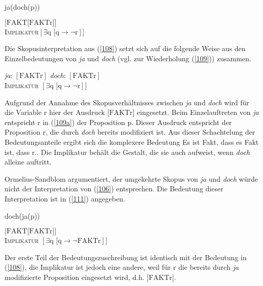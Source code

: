 \begin{exe}
	\ex\label{107}														 
	ja(doch(p))
\end{exe}

\begin{exe}
	\ex\label{108}														 
	$[\textrm{FAKT[FAKTr]]}$\\
	\textsc{Implikatur}$ [\exists \textrm{q [q} \rightarrow \neg \textrm{r}]]$
	\hfill\hbox {\citet[93]{Ormelius-Sandblom1997}}
\end{exe}
Die Skopusinterpretation aus (\ref{108}) setzt sich auf die folgende Weise aus den Einzelbedeutungen von \textit{ja} und \textit{doch} (vgl. zur Wiederholung (\ref{109})) zusammen.

\begin{exe}
	\ex\label{109} 
		\begin{xlist}	
			\ex\label{109a} \textit{ja}: $[\textrm{FAKTr}]$
			\ex\label{109b}  \textit{doch}: $[\textrm{FAKTr}]$ \\
							\textsc{Implikatur} $[\exists \textrm{q [q} \rightarrow \neg \textrm{r}]]$			
		\end{xlist}
\end{exe}
Aufgrund der Annahme des Skopusverhältnisses zwischen \textit{ja }und \textit{doch} wird für die Variable r hier der Ausdruck $\textrm{[FAKTr]}$ eingesetzt. Beim Einzelauftreten von \textit{ja} entspricht r in (\ref{109a}) der Proposition p. Dieser Ausdruck entspricht der Proposition r, die durch \textit{doch} bereits modifiziert ist. Aus dieser Schachtelung der Bedeutungsanteile ergibt sich die komplexere Bedeutung \glq Es ist Fakt, dass es Fakt ist, dass r.\grq {}. Die Implikatur behält die Gestalt, die sie auch aufweist, wenn \textit{doch} alleine auftritt.
 
Ormelius-Sandblom argumentiert, der umgekehrte Skopus von \textit{ja} und \textit{doch} würde nicht der Interpretation von (\ref{106}) entsprechen. Die Bedeutung dieser Interpretation ist in (\ref{111}) angegeben.

\begin{exe}
	\ex\label{110}														 
	doch(ja(p))
\end{exe}
\vspace{-0.65cm}
\begin{exe}
	\ex\label{111}														 
	$\textrm{[FAKT[FAKTr}]]$\\
	\textsc{Implikatur} $[\exists \textrm{q [q} \rightarrow \neg \textrm{FAKTr}]]$
	\hfill\hbox {\citet[93]{Ormelius-Sandblom1997}}
\end{exe}
Der erste Teil der Bedeutungszuschreibung ist identisch mit der Bedeutung in (\ref{108}), die Implikatur ist jedoch eine andere, weil für r die bereits durch \textit{ja} modifizierte Proposition eingesetzt wird, d.h. $\textrm{[FAKTr}]$.

